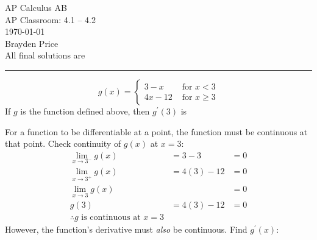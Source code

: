 \documentclass[12pt,letterpaper, onecolumn]{exam}
\begin{document}
\begingroup  
    \centering
    \LARGE AP Calculus AB\\
    \LARGE AP Classroom: 4.1 -- 4.2\\[0.5em]
    \large \today\\[0.5em]
    \large Brayden Price \\
    All final solutions are  \\
\endgroup
\rule{\textwidth}{0.4pt}

\listofexercises
\clearpage

\printanswers
\renewcommand{\solutiontitle}{\noindent\textbf{Solution:}\enspace}   %

\begin{questions}

\question $$ g(x)= \begin{cases}3-x & \text { for } x<3 \\ 4 x-12 & \text { for } x \geq 3\end{cases} $$
	If $g$ is the function defined above, then $g^{\prime}(3)$ is

    \begin{solution}
          For a function to be differentiable at a point, the function must be continuous at that point.
	Check continuity of $g(x)$ at $x=3$:
	\begin{align*}
		\lim_{x\to3^-} g(x)  & = 3-3              & = 0 \\ %
		\lim_{x\to3^+} g(x)  & = 4(3)-12          & = 0 \\ %
		\lim_{x\to3} g(x)    &                    & = 0  \\ %
		g(3)                 & = 4(3)-12          & = 0 \\  %
		\therefore g \text{ is continuous at } x=3
	\end{align*}
	However, the function's derivative must \emph{also} be continuous.
	Find $g^\prime(x)$:
	

\end{solution}
\end{questions}
\end{document}
